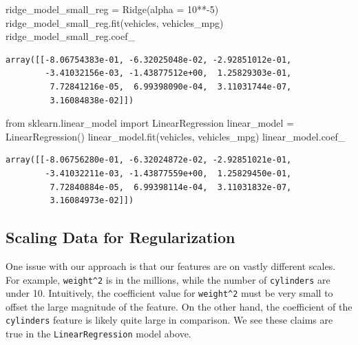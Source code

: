 \documentclass[
  letterpaper,
  DIV=11,
  numbers=noendperiod]{scrreprt}
\newenvironment{Shaded}{\begin{snugshade}}{\end{snugshade}}
\newcommand{\DecValTok}[1]{\textcolor[rgb]{0.68,0.00,0.00}{#1}}
\newcommand{\ImportTok}[1]{\textcolor[rgb]{0.00,0.46,0.62}{#1}}
\newcommand{\NormalTok}[1]{\textcolor[rgb]{0.00,0.23,0.31}{#1}}
\newcommand{\OperatorTok}[1]{\textcolor[rgb]{0.37,0.37,0.37}{#1}}
\begin{document}
\begin{Shaded}
\begin{Highlighting}[]
\NormalTok{ridge\_model\_small\_reg }\OperatorTok{=}\NormalTok{ Ridge(alpha }\OperatorTok{=} \DecValTok{10}\OperatorTok{**{-}}\DecValTok{5}\NormalTok{)}
\NormalTok{ridge\_model\_small\_reg.fit(vehicles, vehicles\_mpg)}
\NormalTok{ridge\_model\_small\_reg.coef\_}
\end{Highlighting}
\end{Shaded}

\begin{verbatim}
array([[-8.06754383e-01, -6.32025048e-02, -2.92851012e-01,
        -3.41032156e-03, -1.43877512e+00,  1.25829303e-01,
         7.72841216e-05,  6.99398090e-04,  3.11031744e-07,
         3.16084838e-02]])
\end{verbatim}

\begin{Shaded}
\begin{Highlighting}[]
\ImportTok{from}\NormalTok{ sklearn.linear\_model }\ImportTok{import}\NormalTok{ LinearRegression}
\NormalTok{linear\_model }\OperatorTok{=}\NormalTok{ LinearRegression()}
\NormalTok{linear\_model.fit(vehicles, vehicles\_mpg)}
\NormalTok{linear\_model.coef\_}
\end{Highlighting}
\end{Shaded}

\begin{verbatim}
array([[-8.06756280e-01, -6.32024872e-02, -2.92851021e-01,
        -3.41032211e-03, -1.43877559e+00,  1.25829450e-01,
         7.72840884e-05,  6.99398114e-04,  3.11031832e-07,
         3.16084973e-02]])
\end{verbatim}

\hypertarget{scaling-data-for-regularization}{%
\subsection{Scaling Data for
Regularization}\label{scaling-data-for-regularization}}

One issue with our approach is that our features are on vastly different
scales. For example, \texttt{weight\^{}2} is in the millions, while the
number of \texttt{cylinders} are under 10. Intuitively, the coefficient
value for \texttt{weight\^{}2} must be very small to offset the large
magnitude of the feature. On the other hand, the coefficient of the
\texttt{cylinders} feature is likely quite large in comparison. We see
these claims are true in the \texttt{LinearRegression} model above.
\end{document}
